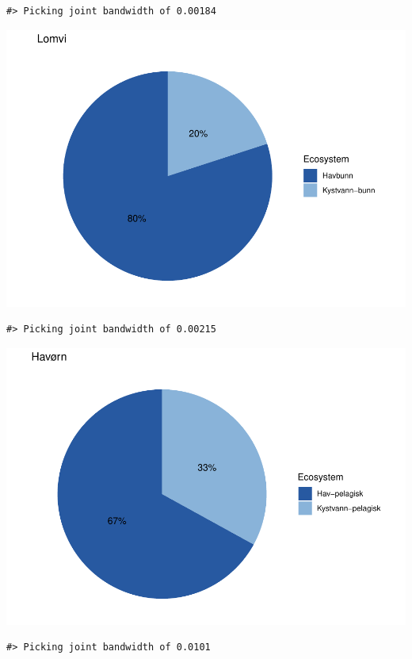 \documentclass[
]{book}
\begin{document}
\begin{verbatim}
#> Picking joint bandwidth of 0.00184
\end{verbatim}

\includegraphics{04-other_figures_files/figure-latex/unnamed-chunk-5-4.pdf}

\begin{verbatim}
#> Picking joint bandwidth of 0.00215
\end{verbatim}

\includegraphics{04-other_figures_files/figure-latex/unnamed-chunk-5-5.pdf}

\begin{verbatim}
#> Picking joint bandwidth of 0.0101
\end{verbatim}
\end{document}
